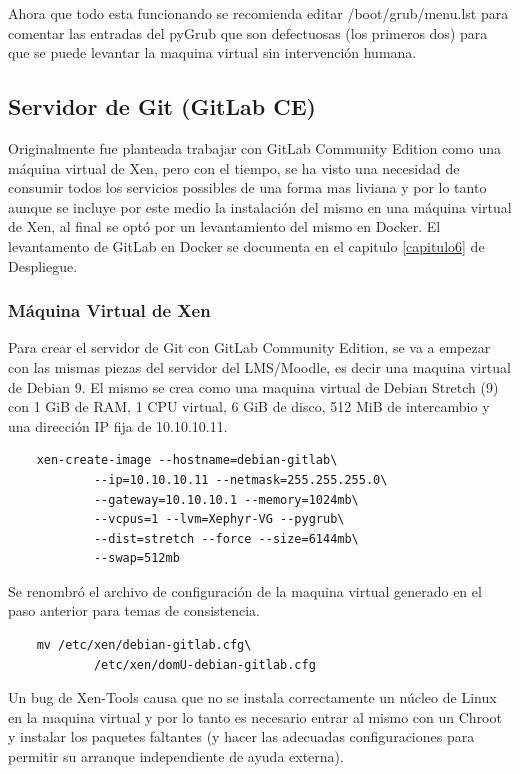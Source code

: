 Ahora que todo esta funcionando se recomienda editar /boot/grub/menu.lst para comentar las entradas del pyGrub que son defectuosas (los primeros dos) para que se puede levantar la maquina virtual sin intervención humana.

 
\subsection{Servidor de Git (GitLab CE)}
Originalmente fue planteada trabajar con GitLab Community Edition como una máquina virtual de Xen, pero con el tiempo, se ha visto una necesidad de consumir todos los servicios possibles de una forma mas liviana y por lo tanto aunque se incluye por este medio la instalación del mismo en una máquina virtual de Xen, al final se optó por un levantamiento del mismo en Docker. El levantamento de GitLab en Docker se documenta en el capitulo \ref{capitulo6} de Despliegue.

\subsubsection{Máquina Virtual de Xen}
Para crear el servidor de Git con GitLab Community Edition, se va a empezar con las mismas piezas del servidor del LMS/Moodle, es decir una maquina virtual de Debian 9. El mismo se crea como una maquina virtual de Debian Stretch (9) con 1 GiB de RAM, 1 CPU virtual, 6 GiB de disco, 512 MiB de intercambio y una dirección IP fija de 10.10.10.11.
\begin{lstlisting}
	xen-create-image --hostname=debian-gitlab\
    		--ip=10.10.10.11 --netmask=255.255.255.0\
        	--gateway=10.10.10.1 --memory=1024mb\
        	--vcpus=1 --lvm=Xephyr-VG --pygrub\
        	--dist=stretch --force --size=6144mb\
        	--swap=512mb
\end{lstlisting}

Se renombró el archivo de configuración de la maquina virtual generado en el paso anterior para temas de consistencia.

\begin{lstlisting}
	mv /etc/xen/debian-gitlab.cfg\
    		/etc/xen/domU-debian-gitlab.cfg
\end{lstlisting}

Un bug de Xen-Tools causa que no se instala correctamente un núcleo de Linux en la maquina virtual y por lo tanto es necesario entrar al mismo con un Chroot y instalar los paquetes faltantes (y hacer las adecuadas configuraciones  para permitir su arranque independiente de ayuda externa).

